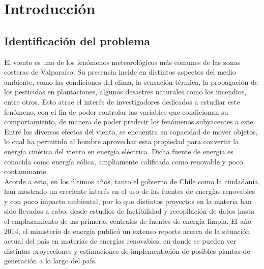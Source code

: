 
\chapter{Introducción}

\section{Identificación del problema}
El viento es uno de los fenómenos meteorológicos más comunes de las zonas costeras de Valparaíso. Su presencia incide en distintos aspectos del medio ambiente, como las condiciones del clima, la sensación térmica, la propagación de los pesticidas en plantaciones, algunos desastres naturales como los incendios, entre otros. Esto atrae el interés de investigadores dedicados a estudiar este fenómeno, con el fin de poder controlar las variables que condicionan su comportamiento, de manera de poder predecir los fenómenos subyacentes a este.\\ 
Entre los diversos efectos del viento, se encuentra su capacidad de mover objetos, lo cual ha permitido al hombre aprovechar esta propiedad para convertir la energía cinética del viento en energía eléctrica. Dicha fuente de energía es conocida como energía eólica, ampliamente calificada como renovable y poco contaminante.\\
Acorde a esto, en los últimos años, tanto el gobierno de Chile como la ciudadanía, han mostrado un creciente interés en el uso de las fuentes de energías renovables y con poco impacto ambiental, por lo que distintos proyectos en la materia han sido llevados a cabo, desde estudios de factibilidad y recopilación de datos hasta el emplazamiento de las primeras centrales de fuentes de energía limpia. El año 2014, el ministerio de energía publicó un extenso reporte acerca de la situación actual del país en materias de energías renovables, en donde se pueden ver distintas proyecciones y estimaciones de implementación de posibles plantas de generación a lo largo del país. \cite{minenergia14}\\


